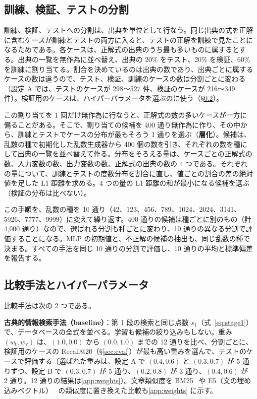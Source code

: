 \documentclass[11pt,a4paper]{ltjsarticle}
\begin{document}
\subsection{訓練、検証、テストの分割}\label{sec:split}
訓練、検証、テストへの分割は、出典を単位として行なう。同じ出典の式を正解に含むケースが訓練とテストの両方に入ると、テストの正解を訓練で見たことになるためである。各ケースは、正解式の出典のうち最も多いものに属するとする。出典の一覧を無作為に並べ替え、出典の 20\% をテスト、20\% を検証、60\% を訓練に割り当てる。割合を決めているのは出典の数であり、出典ごとに属するケースの数は違うので、テスト、検証、訓練のケースの数は分割ごとに変わる（設定 A では、テストのケースが 298〜527 件、検証のケースが 216〜349 件）。検証用のケースは、ハイパーパラメータを選ぶのに使う（\S\ref{sec:compared}）。

この割り当てを 1 回だけ無作為に行なうと、正解式の数の多いケースが一方に偏ることがある。そこで、割り当ての候補を 400 通り無作為に作り、その中から、訓練とテストでケースの分布が最もそろう 1 通りを選ぶ（\textbf{層化}）。候補は、乱数の種で初期化した乱数生成器から 400 個の数を引き、それぞれの数を種にして出典の一覧を並べ替えて作る。分布をそろえる量は、ケースごとの正解式の数、入力変数の数、出力変数の数、正解式の出典の数の 4 つである。それぞれの量について、訓練とテストの度数分布を割合に直し、値ごとの割合の差の絶対値を足した L1 距離を求める。4 つの量の L1 距離の和が最小になる候補を選ぶ（検証の分布は比べない）。

この手順を、乱数の種を 10 通り（42、123、456、789、1024、2024、3141、5926、7777、9999）に変えて繰り返す。400 通りの候補は種ごとに別のもの（計 4{,}000 通り）なので、選ばれる分割も種ごとに変わり、10 通りの異なる分割で評価することになる。MLP の初期値と、不正解の候補の抽出も、同じ乱数の種で決まる。すべての手法を同じ 10 通りの分割で評価し、10 通りの平均と標準偏差を報告する。

\subsection{比較手法とハイパーパラメータ}\label{sec:compared}
比較手法は次の 2 つである。

\textbf{古典的情報検索手法（baseline）}：第 1 段の検索と同じ点数 $s_1$（式~\eqref{eq:stage1}）で、データベースの全式を並べる。学習も候補の絞り込みもしない。重み $(w_{\mathrm{t}}, w_{\mathrm{v}})$ は、$(1.0, 0.0)$ から $(0.0, 1.0)$ までの 12 通りを比べ、分割ごとに、検証用のケースの Recall@20（\S\ref{sec:eval}）が最も高い重みを選んで、テストのケースで評価する（選ばれた重みは、設定 A で $(0.4, 0.6)$ と $(0.3, 0.7)$ が 5 通りずつ、設定 B で $(0.3, 0.7)$ が 5 通り、$(0.2, 0.8)$ が 3 通り、$(0.4, 0.6)$ が 2 通り。12 通りの結果は\ref{app:weights}）。文章類似度を BM25~\citep{BM25} や E5（文の埋め込みベクトル）~\citep{E5} の類似度に置き換えた比較も\ref{app:weights} に示す。
\end{document}
